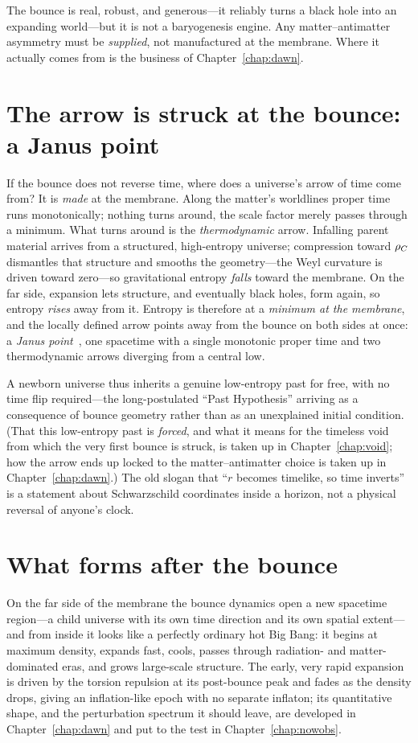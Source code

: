 The bounce is real, robust, and generous---it reliably turns a black hole into an
expanding world---but it is not a baryogenesis engine. Any matter--antimatter
asymmetry must be \emph{supplied}, not manufactured at the membrane. Where it
actually comes from is the business of Chapter~\ref{chap:dawn}.

\section{The arrow is struck at the bounce: a Janus point}
\label{sec:janus}

If the bounce does not reverse time, where does a universe's arrow of time come
from? It is \emph{made} at the membrane. Along the matter's worldlines proper
time runs monotonically; nothing turns around, the scale factor merely passes
through a minimum. What turns around is the \emph{thermodynamic} arrow. Infalling
parent material arrives from a structured, high-entropy universe; compression
toward $\rho_{C}$ dismantles that structure and smooths the geometry---the Weyl
curvature is driven toward zero---so gravitational entropy \emph{falls} toward the
membrane. On the far side, expansion lets structure, and eventually black holes,
form again, so entropy \emph{rises} away from it. Entropy is therefore at a
\emph{minimum at the membrane}, and the locally defined arrow points away from the
bounce on both sides at once: a \emph{Janus point}~\citep{barbour2014}, one
spacetime with a single monotonic proper time and two thermodynamic arrows
diverging from a central low.

A newborn universe thus inherits a genuine low-entropy past for free, with no time
flip required---the long-postulated ``Past Hypothesis'' arriving as a consequence
of bounce geometry rather than as an unexplained initial condition. (That this
low-entropy past is \emph{forced}, and what it means for the timeless void from
which the very first bounce is struck, is taken up in Chapter~\ref{chap:void}; how
the arrow ends up locked to the matter--antimatter choice is taken up in
Chapter~\ref{chap:dawn}.) The old slogan that ``$r$ becomes timelike, so time
inverts'' is a statement about Schwarzschild coordinates inside a horizon, not a
physical reversal of anyone's clock.

\section{What forms after the bounce}

On the far side of the membrane the bounce dynamics open a new spacetime
region---a child universe with its own time direction and its own spatial
extent---and from inside it looks like a perfectly ordinary hot Big Bang: it
begins at maximum density, expands fast, cools, passes through radiation- and
matter-dominated eras, and grows large-scale structure. The early, very rapid
expansion is driven by the torsion repulsion at its post-bounce peak and fades as
the density drops, giving an inflation-like epoch with no separate inflaton; its
quantitative shape, and the perturbation spectrum it should leave, are developed
in Chapter~\ref{chap:dawn} and put to the test in Chapter~\ref{chap:nowobs}.


